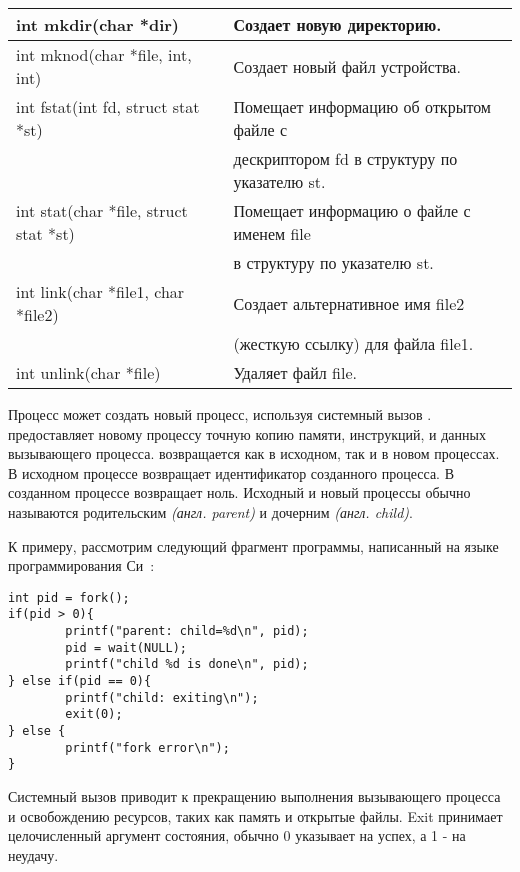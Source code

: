 \begin{longtable}[c]{l|l}
\hline
int mkdir(char *dir)                  & Создает новую директорию. \\
\hline
int mknod(char *file, int, int)       & Создает новый файл устройства. \\
\hline
int fstat(int fd, struct stat *st)    & Помещает информацию об открытом файле с \\
                                      & дескриптором fd в структуру по указателю st. \\
\hline
int stat(char *file, struct stat *st) & Помещает информацию о файле с именем file \\
                                      & в структуру по указателю st. \\
\hline
int link(char *file1, char *file2)    & Создает альтернативное имя file2 \\
                                      & (жесткую ссылку) для файла file1. \\
\hline
int unlink(char *file)                & Удаляет файл file. \\
\hline
\end{longtable}
\fi

Процесс может создать новый процесс,
используя системный вызов \emph{}.
 предоставляет новому процессу точную копию
памяти, инструкций, и данных вызывающего процесса.
 возвращается как в исходном,
так и в новом процессах.
В исходном процессе  возвращает
идентификатор созданного процесса.
В созданном процессе  возвращает ноль.
Исходный и новый процессы обычно называются
родительским \emph{(англ. parent)}
и дочерним \emph{(англ. child)}.

К примеру, рассмотрим следующий фрагмент программы,
написанный на языке программирования Си~\cite{kernighan}:

\begin{lstlisting}[]
int pid = fork();
if(pid > 0){
        printf("parent: child=%d\n", pid);
        pid = wait(NULL);
        printf("child %d is done\n", pid);
} else if(pid == 0){
        printf("child: exiting\n");
        exit(0);
} else {
        printf("fork error\n");
}
\end{lstlisting}

Системный вызов  приводит
к прекращению выполнения вызывающего процесса
и освобождению ресурсов,
таких как память и открытые файлы.
Exit принимает целочисленный аргумент состояния,
обычно 0 указывает на успех, а 1 - на неудачу.

